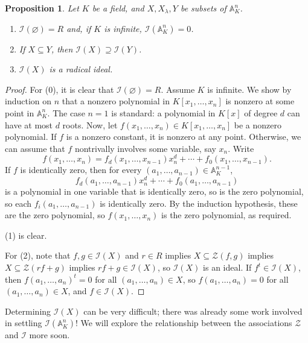 \documentclass{amsart}[12pt]
\newcommand{\A}{\mathbb{A}}
\newcommand{\cZ}{\mathcal{Z}}
\newcommand{\cI}{\mathcal{I}}
\numberwithin{equation}{section}
\theoremstyle{plain} %
\newtheorem{prop}[equation]{Proposition}
\theoremstyle{definition}
\theoremstyle{remark}
\begin{document}
\begin{prop} Let $K$ be a field, and $X,X_\lambda,Y$ be subsets of $\A^n_K$.
\begin{enumerate}
\item[(0)] $\cI(\varnothing) = R$ and, if $K$ is infinite, $\cI(\A^n_K) =  0$.
\item If $X \subseteq Y$, then $\cI(X) \supseteq \cI(Y)$.
\item $\cI(X)$ is a radical ideal.
\end{enumerate}
\end{prop}
\begin{proof}
For (0), it is clear that $\cI(\varnothing) = R$. Assume $K$ is infinite. We show by induction on $n$ that a nonzero polynomial in  $K[x_1,\dots,x_n]$ is nonzero at some point in $\A^n_K$. The case $n=1$ is standard: a polynomial in $K[x]$ of degree $d$ can have at most $d$ roots. Now, let $f(x_1,\dots,x_n)\in K[x_1,\dots,x_n]$ be a nonzero polynomial. If $f$ is a nonzero constant, it is nonzero at any point. Otherwise, we can assume that $f$ nontrivally involves some variable, say $x_n$. Write
\[f(x_1,\dots,x_n) = f_d(x_1,\dots,x_{n-1}) x_n^d + \cdots + f_0(x_1,\dots,x_{n-1}).\]
If $f$ is identically zero, then for every $(a_1,\dots,a_{n-1})\in \A^{n-1}_K$, 
\[f_d(a_1,\dots,a_{n-1}) x_n^d + \cdots + f_0(a_1,\dots,a_{n-1}) \]
is a polynomial in one variable that is identically zero, so is the zero polynomial, so each $f_i(a_1,\dots,a_{n-1})$ is identically zero. By the induction hypothesis, these are the zero polynomial, so $f(x_1,\dots,x_n)$ is the zero polynomial, as required.

(1) is clear.

For (2), note that $f,g\in \cI(X)$ and $r\in R$ implies $X\subseteq \cZ(f,g)$ implies $X \subseteq \cZ(rf+g)$ implies $rf+g \in \cI(X)$, so $\cI(X)$ is an ideal. If $f^t\in \cI(X)$, then $f(a_1,\dots,a_n)^t=0$ for all $(a_1,\dots,a_n)\in X$, so $f(a_1,\dots,a_n)=0$ for all $(a_1,\dots,a_n)\in X$, and $f\in \cI(X)$. \qedhere

\end{proof}

Determining $\cI(X)$ can be very difficult; there was already some work involved in settling $\cI(\A^n_K)$! We will explore the relationship between the associations $\cZ$ and $\cI$ more soon. 

\end{document}
